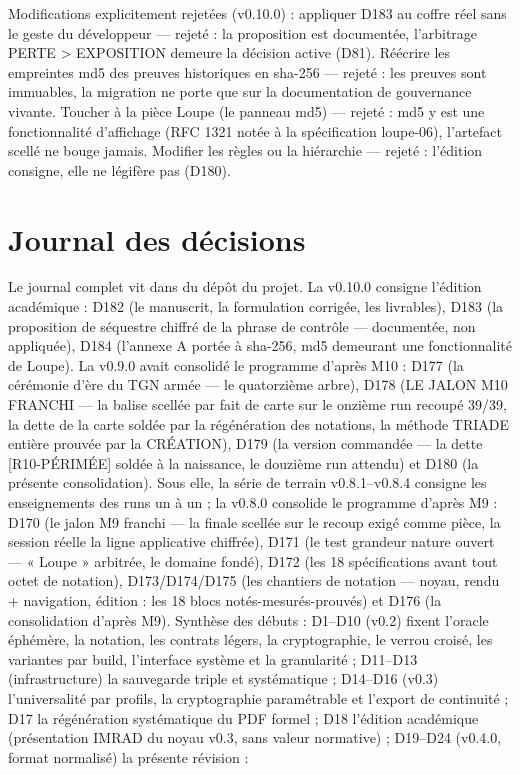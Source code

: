 Modifications explicitement rejetées (v0.10.0) : appliquer D183 au coffre
réel sans le geste du développeur — rejeté : la proposition est documentée,
l'arbitrage PERTE > EXPOSITION demeure la décision active (D81). Réécrire
les empreintes md5 des preuves historiques en sha-256 — rejeté : les
preuves sont immuables, la migration ne porte que sur la documentation de
gouvernance vivante. Toucher à la pièce Loupe (le panneau md5) — rejeté :
md5 y est une fonctionnalité d'affichage (RFC 1321 notée à la spécification
loupe-06), l'artefact scellé ne bouge jamais. Modifier les règles ou la
hiérarchie — rejeté : l'édition consigne, elle ne légifère pas (D180).

\section{Journal des décisions}\label{sec:decisions}

Le journal complet vit dans  du dépôt du projet. La
v0.10.0 consigne l'édition académique : D182 (le manuscrit, la formulation
corrigée, les livrables), D183 (la proposition de séquestre chiffré de la
phrase de contrôle — documentée, non appliquée), D184 (l'annexe A portée à
sha-256, md5 demeurant une fonctionnalité de Loupe). La v0.9.0 avait
consolidé le programme d'après M10 : D177 (la cérémonie d'ère du TGN
armée — le quatorzième arbre), D178 (LE JALON M10 FRANCHI — la balise
 scellée par fait de carte sur le onzième run recoupé 39/39,
la dette de la carte soldée par la régénération des notations, la méthode TRIADE
entière prouvée par la CRÉATION), D179 (la version  commandée
— la dette [R10-PÉRIMÉE] soldée à la naissance, le douzième run attendu) et
D180 (la présente consolidation). Sous elle, la série de terrain v0.8.1–v0.8.4
consigne les enseignements des runs un à un ; la v0.8.0 consolide le programme
d'après M9 : D170 (le jalon M9 franchi — la finale  scellée sur le
recoup exigé comme pièce, la session réelle la ligne applicative chiffrée),
D171 (le test grandeur nature ouvert — « Loupe » arbitrée, le domaine
 fondé), D172 (les 18 spécifications avant tout octet de notation),
D173/D174/D175 (les chantiers de notation — noyau, rendu + navigation, édition :
les 18 blocs notés-mesurés-prouvés) et D176 (la consolidation d'après M9).
Synthèse des débuts :
D1–D10 (v0.2) fixent l'oracle éphémère, la notation, les contrats légers, la
cryptographie, le verrou croisé, les variantes par build, l'interface système et la
granularité ; D11–D13 (infrastructure) la sauvegarde triple et systématique ; D14–D16
(v0.3) l'universalité par profils, la cryptographie paramétrable et l'export de
continuité ; D17 la régénération systématique du PDF formel ; D18 l'édition académique
(présentation IMRAD du noyau v0.3, sans valeur normative) ; D19–D24 (v0.4.0, format
normalisé) la présente révision :

